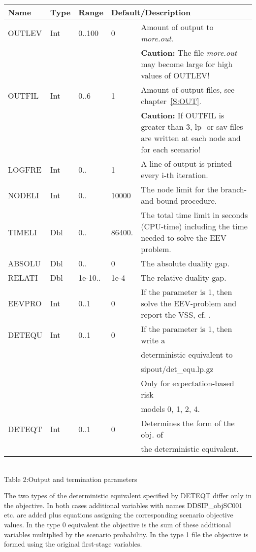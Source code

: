 \documentclass[11pt,draft]{article}
\newcommand{\+}{{\ti{+}}}
\newcommand{\1}{{\ti{1}}}
\begin{document}
\begin{center}
\begin{tabular}{|llllp{6.4cm}|} 
\hline
Name&Type&Range&\multicolumn{2}{l|}{Default/Description}\\ \hline
OUTLEV&Int&0..100&0&Amount of output to {\it more.out}.\\&&&& {\bf Caution:} The file {\it more.out} may become
large for high values of OUTLEV!\medskip\\  
OUTFIL&Int&0..6&1&Amount of output files, see
chapter~\ref{S:OUT}.\\&&&& {\bf Caution:} If OUTFIL is greater than 3, lp- or sav-files are written at each node
and for each scenario! \medskip\\  
LOGFRE&Int&0..&1&A line of output is printed every i-th iteration. \medskip\\
NODELI&Int&0..&10000&The node limit for the branch-and-bound procedure. \medskip\\  
TIMELI&Dbl&0..&86400.&The total time limit in seconds (CPU-time) 
including the time needed to solve the EEV problem. \medskip\\ 
ABSOLU&Dbl&0..&0&The absolute duality gap.\medskip\\ 
RELATI&Dbl&1e-10..&1e-4&The relative duality gap.\\
EEVPRO&Int&0..1&0&If the parameter is 1, then solve the EEV-problem and report the VSS, cf. \cite{bir}.\medskip\\  
DETEQU&Int&0..1&0&If the parameter is 1, then write a \\&&&&deterministic equivalent to\\&&&& sipout/det\_equ.lp.gz\\&&&& Only for expectation-based risk\\&&&& models 0, 1, 2, 4.\\
DETEQT&Int&0..1&0&Determines the form of the obj. of\\&&&& the deterministic equivalent.\\
\hline
\end{tabular}\\[0.5em]
{Table 2:\quad Output and termination parameters}
\end{center}
%

The two types of the deterministic equivalent specified by DETEQT differ only in the objective.
In both cases additional variables with names DDSIP\_objSC001 etc. are added plus equations assigning the corresponding scenario objective values.
In the type 0 equivalent the objective is the sum of these additional variables multiplied by the scenario probability.
In the type 1 file the objective is formed using the original first-stage variables.
\end{document}
